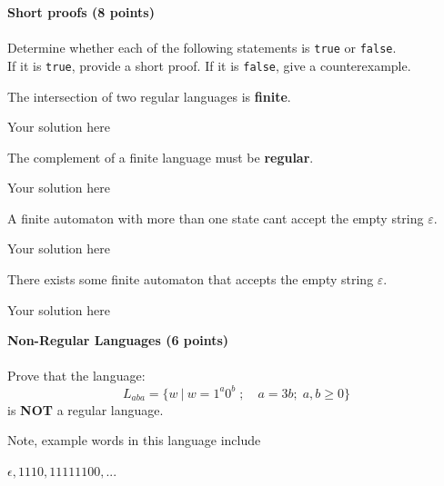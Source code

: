 \documentclass[12pt]{article}
\newenvironment{question}[2][Question]{\begin{trivlist}
\item[\hskip \labelsep {\bfseries #1}\hskip \labelsep {\bfseries #2.}]}{\end{trivlist}}
\newenvironment{solution}[1][Solution:]{\begin{trivlist}
\item[\hskip \labelsep {\bfseries #1}\hskip \labelsep {\bfseries}]\color{blue}}{\end{trivlist}}
\begin{document}
\clearpage
\begin{question}{7}\textbf{Short proofs (8 points)}\\\\

Determine whether each of the following statements is \texttt{true} or \texttt{false}.\\ If it is \texttt{true}, provide a short proof. If it is \texttt{false}, give a counterexample.

\begin{enumerate}[(a)]
\item The intersection of two regular languages is \textbf{finite}.
\begin{solution}
    \;

Your solution here

\end{solution}

\item The complement of a finite language must be \textbf{regular}.
\begin{solution}
    \;

    Your solution here
\end{solution}

\item A finite automaton with more than one state cant accept the empty string $\varepsilon$.
\begin{solution}
   \;

   Your solution here
\end{solution}

\item There exists some finite automaton that accepts the empty string $\varepsilon$.
\begin{solution}
\;

Your solution here
\end{solution}
\end{enumerate}

\end{question}

\clearpage
\begin{question}{8}\textbf{Non-Regular Languages (6 points)}\\\\

Prove that the language: \[L_{aba} = \{w \ | \ w = 1^a0^b \; ; \quad a = 3b ; \; a, b \geq 0 \} \] is \textbf{NOT} a regular language.

Note, example words in this language include

$\epsilon, 1110, 11111100,...$
\end{question}
\end{document}
